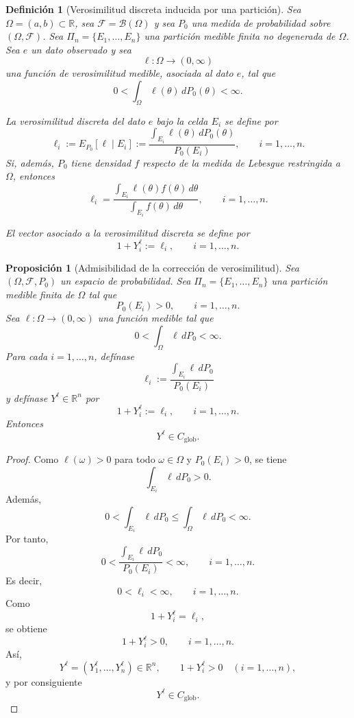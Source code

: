 \documentclass[12pt]{article}
\newtheorem{definicion}{Definición}[section]
\newtheorem{proposicion}{Proposición}[section]
\begin{document}
\begin{definicion}[Verosimilitud discreta inducida por una partición]\label{def:verosimilitud_global}
Sea $\Omega=(a,b)\subset\mathbb R$, sea $\mathcal F=\mathcal B(\Omega)$ y sea $P_0$ una medida de probabilidad sobre $(\Omega,\mathcal F)$. Sea $\Pi_n=\{E_1,\dots,E_n\}$ una partición medible finita no degenerada de $\Omega$. Sea $e$ un dato observado y sea
\[
\ell:\Omega\to(0,\infty)
\]
una función de verosimilitud medible, asociada al dato $e$, tal que
\[
0<\int_\Omega \ell(\theta)\,dP_0(\theta)<\infty.
\]

La \emph{verosimilitud discreta del dato $e$ bajo la celda $E_i$} se define por
\[
\ell_i
:=E_{P_0}[\ell\mid E_i]
:=
\frac{\displaystyle\int_{E_i}\ell(\theta)\,dP_0(\theta)}{P_0(E_i)},
\qquad i=1,\dots,n.
\]
Si, además, $P_0$ tiene densidad $f$ respecto de la medida de Lebesgue restringida a $\Omega$, entonces
\[
\ell_i
=
\frac{\displaystyle\int_{E_i}\ell(\theta)f(\theta)\,d\theta}{\displaystyle\int_{E_i}f(\theta)\,d\theta},
\qquad i=1,\dots,n.
\]

El vector asociado a la verosimilitud discreta se define por
\[
1+Y_i^\ell:=\ell_i,
\qquad i=1,\dots,n.
\]
\end{definicion}

\begin{proposicion}[Admisibilidad de la corrección de verosimilitud]\label{prop:admisibilidad_verosimilitud_global}
Sea $(\Omega,\mathcal F,P_0)$ un espacio de probabilidad. Sea $\Pi_n=\{E_1,\dots,E_n\}$ una partición medible finita de $\Omega$ tal que
\[
P_0(E_i)>0,
\qquad i=1,\dots,n.
\]
Sea $\ell:\Omega\to(0,\infty)$ una función medible tal que
\[
0<\int_\Omega \ell\,dP_0<\infty.
\]
Para cada $i=1,\dots,n$, defínase
\[
\ell_i:=\frac{\displaystyle\int_{E_i}\ell\,dP_0}{P_0(E_i)}
\]
y defínase $Y^\ell\in\mathbb R^n$ por
\[
1+Y_i^\ell:=\ell_i,
\qquad i=1,\dots,n.
\]
Entonces
\[
Y^\ell\in C_{\mathrm{glob}}.
\]
\end{proposicion}

\begin{proof}
Como $\ell(\omega)>0$ para todo $\omega\in\Omega$ y $P_0(E_i)>0$, se tiene
\[
\int_{E_i}\ell\,dP_0>0.
\]
Además,
\[
0<\int_{E_i}\ell\,dP_0
\le
\int_\Omega \ell\,dP_0
<\infty.
\]
Por tanto,
\[
0<
\frac{\displaystyle\int_{E_i}\ell\,dP_0}{P_0(E_i)}
<\infty,
\qquad i=1,\dots,n.
\]
Es decir,
\[
0<\ell_i<\infty,
\qquad i=1,\dots,n.
\]
Como
\[
1+Y_i^\ell=\ell_i,
\]
se obtiene
\[
1+Y_i^\ell>0,
\qquad i=1,\dots,n.
\]
Así,
\[
Y^\ell=(Y_1^\ell,\dots,Y_n^\ell)\in\mathbb R^n,
\qquad
1+Y_i^\ell>0\quad (i=1,\dots,n),
\]
y por consiguiente
\[
Y^\ell\in C_{\mathrm{glob}}.
\]
\end{proof}
\end{document}

